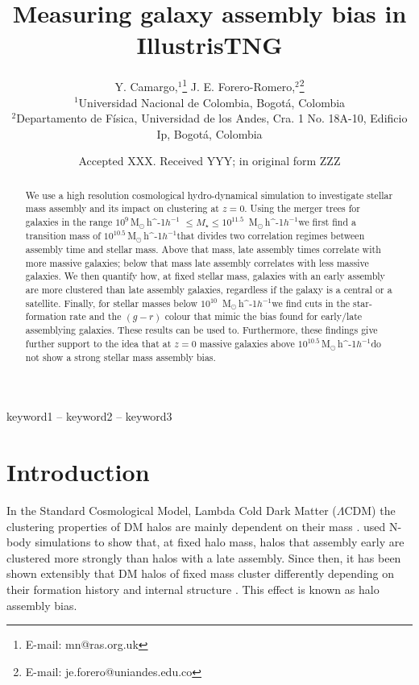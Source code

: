 \documentclass[fleqn,usenatbib]{mnras}
\title[Galaxy Assembly Bias]{Measuring galaxy assembly bias in IllustrisTNG}
\author[Camargo, Y. \& Forero-Romero J. E.]{
Y. Camargo,$^{1}$\thanks{E-mail: mn@ras.org.uk}
J. E. Forero-Romero,$^{2}$\thanks{E-mail: je.forero@uniandes.edu.co}
\\
$^{1}$Universidad Nacional de Colombia, Bogot\'a, Colombia\\
$^{2}$Departamento de F\'isica, Universidad de los Andes, Cra. 1 No.
18A-10, Edificio Ip, Bogot\'a, Colombia\\
}
\date{Accepted XXX. Received YYY; in original form ZZZ}
\newcommand{\Msunh}{\,{\rm M}$_{\odot}$\,\ifmmode h^{-1}\else $h^{-1}$\fi}
\begin{document}
\label{firstpage}
\pagerange{\pageref{firstpage}--\pageref{lastpage}}
\maketitle

\begin{abstract}
    We use a high resolution cosmological hydro-dynamical simulation
    to investigate stellar mass assembly 
    and its impact on clustering at $z=0$.
    Using the merger trees for galaxies in the range $10^{9}$\Msunh
    $\leq M_{\star} \leq 10^{11.5}$ \Msunh we first find a transition
    mass of $10^{10.5}$\Msunh that divides two 
    correlation regimes between assembly time and stellar mass.
    Above that mass, late assembly times correlate with more massive
    galaxies; below that mass late assembly correlates with less massive
galaxies.
We then quantify how, at fixed stellar mass, galaxies with an early
assembly
are more clustered than late assembly galaxies, regardless if the galaxy
is a central or a satellite.
Finally, for stellar masses below $10^{10}$ \Msunh we find 
cuts in the star-formation rate and the $(g-r)$ colour that mimic
the bias found for early/late assemblying galaxies.
These results can be used to.
Furthermore, these findings give further support to the idea that at
$z=0$  massive galaxies above $10^{10.5}$\Msunh do not show a strong
stellar mass assembly bias.
\end{abstract}

\begin{keywords}
keyword1 -- keyword2 -- keyword3
\end{keywords}



\section{Introduction}
In the Standard Cosmological Model, Lambda Cold Dark Matter
($\Lambda$CDM) the clustering properties of DM halos are mainly
dependent on their mass \citep{1984ApJ...284L...9K}.
\cite{2005MNRAS.363L..66G} used N-body simulations to show that, at
fixed halo mass, halos that assembly early are clustered more strongly
than halos with a late assembly.
Since then, it has been shown extensibly that DM halos of fixed mass cluster
differently depending on their formation history and internal
structure \citep{2006ApJ...652...71W,2008ApJ...687...12D}.
This effect is known as halo assembly bias.
\end{document}

